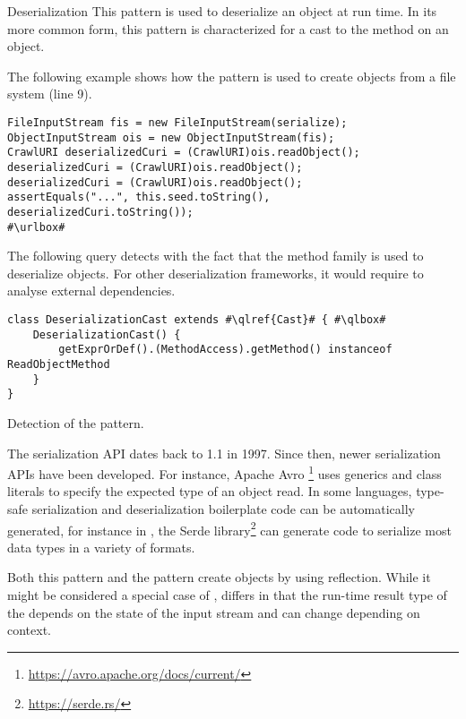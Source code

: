 \begin{pattern}{Deserialization}
This pattern is used to deserialize an object at run time.
In its more common form,
this pattern is characterized for a cast to the  method on an  object.

\instances{}
The following example shows how the \thisp{} pattern is used to create objects from a file system (line 9).

\def\urlvar{http://bit.ly/internetarchive_heritrix3_2SF4j7k}
\begin{verbatim}
FileInputStream fis = new FileInputStream(serialize);
ObjectInputStream ois = new ObjectInputStream(fis);
CrawlURI deserializedCuri = (CrawlURI)ois.readObject();
deserializedCuri = (CrawlURI)ois.readObject();
deserializedCuri = (CrawlURI)ois.readObject();
assertEquals("...", this.seed.toString(), deserializedCuri.toString());
#\urlbox#
\end{verbatim}


\detection{}
The following query detects \thisp{} with the fact that the  method family is used to deserialize objects.
For other deserialization frameworks,
it would require to analyse external dependencies.

\begin{listing}
\begin{verbatim}
class DeserializationCast extends #\qlref{Cast}# { #\qlbox#
	DeserializationCast() {
		getExprOrDef().(MethodAccess).getMethod() instanceof ReadObjectMethod
	}
}
\end{verbatim}
\caption{Detection of the \thisp{} pattern.}
\label{lst:ql:DeserializationCast}
\end{listing}


\issues{}
The serialization API dates back to \java{} 1.1 in 1997.
Since then, newer serialization APIs have been developed.
For instance, Apache Avro%
\footnote{\url{https://avro.apache.org/docs/current/}}
uses generics and class literals to specify the expected type of an object read. 
In some languages,
type-safe serialization and deserialization boilerplate code can be automatically generated,
for instance in \rust{},
the Serde library\footnote{\url{https://serde.rs/}}
can generate code to serialize most data types
in a variety of formats.

Both this pattern and the  pattern create objects by using reflection.
While it might be considered a special case of , 
\thisp{} differs in that the run-time result type of the  depends on the state of the input stream and can change depending on context.
 
\end{pattern}